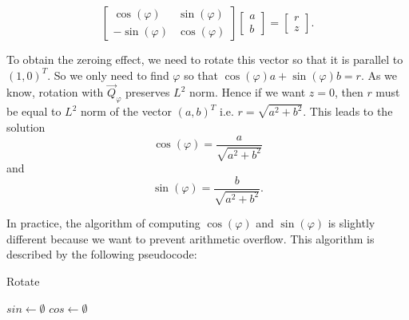 \begin{equation}
    \begin{bmatrix} 
        \cos(\varphi) & \sin(\varphi) \\
        - \sin(\varphi) & \cos(\varphi)
        \end{bmatrix}
        \begin{bmatrix} 
            a \\
            b
            \end{bmatrix} = 
            \begin{bmatrix} 
                r \\
                z
                \end{bmatrix}.
\end{equation}

To obtain the zeroing effect, we need to rotate this vector so that it is parallel to $(1, 0)^T$. So we only need to find $\varphi$ so that $\cos(\varphi) a + \sin(\varphi)b = r $.
As we know, rotation with $\vec{Q}_\varphi$ preserves $L^2$ norm. Hence if we want $z = 0$, then $r$ must be equal to $L^2$ norm of the vector $(a, b)^T$ i.e. $r = \sqrt{a^2 + b^2}$. 
This leads to the solution
\begin{equation} \label{givens_cos}
    \cos(\varphi) = \frac{a}{\sqrt{a^2 + b^2}} 
\end{equation}
and   
\begin{equation} \label{givens_sin}
    \sin(\varphi) = \frac{b}{\sqrt{a^2 + b^2}}. 
\end{equation}

In practice, the algorithm of computing $\cos(\varphi)$ and  $\sin(\varphi)$ is slightly different because we want to prevent arithmetic overflow. This algorithm is described by the following pseudocode:

\begin{algorithm}[H]
    \label{alg:givens}
    \caption{Rotate}
    $sin \gets \emptyset$\;
    $cos \gets \emptyset$\;
    \;
\end{algorithm}

